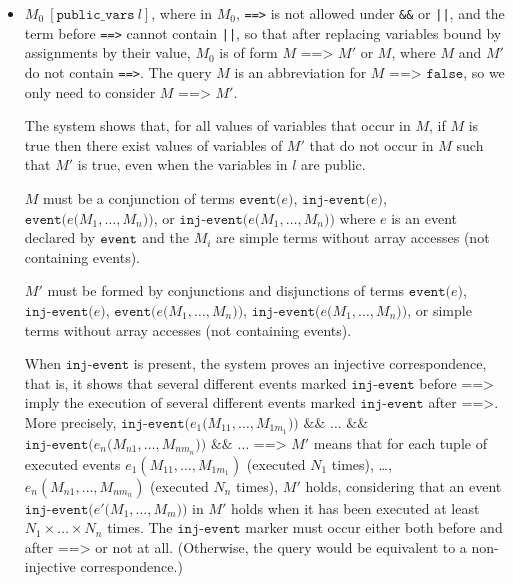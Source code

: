 \begin{itemize}
\begin{itemize}
\item $M_0\ [\texttt{public\_vars}\ l]$, where in $M_0$, \texttt{==>} is not allowed under \texttt{\&\&} or \texttt{||}, and the term before \texttt{==>} cannot contain \texttt{||}, so that after replacing variables bound by assignments by their value, $M_0$ is of form $M \texttt{ ==> } M'$ or $M$, where $M$ and $M'$ do not contain \texttt{==>}. The query $M$ is an abbreviation for $M \texttt{ ==> false}$, so we only need to consider $M \texttt{ ==> } M'$.

The system shows that, for all values of variables that occur in $M$,
if $M$ is true then there exist values of variables of $M'$ that do not
occur in $M$ such that $M'$ is true, even when the variables in $l$ are public.

$M$ must be a conjunction of terms $\texttt{event(}e\texttt{)}$, $\texttt{inj-event(}e\texttt{)}$, 
$\texttt{event(}e\texttt{(}M_1, \ldots, M_n\texttt{))}$, or 
$\texttt{inj-event(}e\texttt{(}M_1, \ldots, M_n\texttt{))}$
where $e$ is an event declared by ${\tt event}$ and
the $M_i$ are simple terms without array accesses (not containing
events). 

$M'$ must be formed by conjunctions and disjunctions of terms 
$\texttt{event(}e\texttt{)}$, $\texttt{inj-event(}e\texttt{)}$, 
$\texttt{event(}e\texttt{(}M_1, \ldots, M_n\texttt{))}$, 
$\texttt{inj-event(}e\texttt{(}M_1, \ldots, M_n\texttt{))}$, or
simple terms without array accesses
(not containing events).

When $\texttt{inj-event}$ is present, the system proves an injective
correspondence, that is, it shows that several different events marked
$\texttt{inj-event}$ before $\texttt{==>}$ imply the execution of several
different events marked $\texttt{inj-event}$ after $\texttt{==>}$.
%
More precisely, $\texttt{inj-event(}e_1\texttt{(}M_{11}, \ldots, M_{1m_1}\texttt{))}$
$\texttt{\&\&}$ $\ldots$ $\texttt{\&\&}$ $\texttt{inj-event(}e_n\texttt{(}M_{n1}, \ldots, \allowbreak
M_{nm_n} \texttt{))}$ $\texttt{\&\&}$ $\ldots$ $\texttt{==>}$ $M'$ means that for each
tuple of executed events $e_1(M_{11}, \allowbreak \ldots, M_{1m_1})$
(executed $N_1$ times), \ldots, $e_n(M_{n1}, \ldots, M_{nm_n})$
(executed $N_n$ times), $M'$ holds, considering that an event
$\texttt{inj-event(}e'\texttt{(}M_1, \ldots, M_m\texttt{))}$ in $M'$ holds when it has been
executed at least $N_1 \times \ldots \times N_n$ times.
%
The $\texttt{inj-event}$ marker must
occur either both before and after $\texttt{==>}$ or not at all. (Otherwise,
the query would be equivalent to a non-injective correspondence.)


\end{itemize}
\end{itemize}
